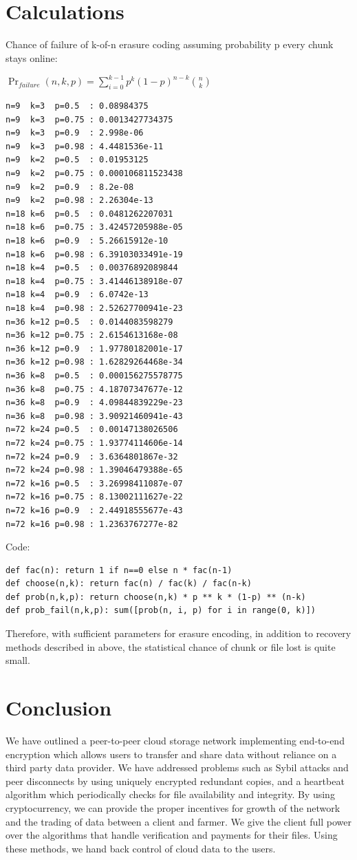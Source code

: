 \documentclass[a4paper,10pt]{article}
\begin{document}
\section{Calculations}
Chance of failure of k-of-n erasure coding assuming probability p every chunk stays online:

{\centering
$\Pr_{failure}(n,k,p) = \displaystyle \sum_{i=0}^{k-1} p^{k}(1-p)^{n-k }{n \choose k}$
\\}


\begin{lstlisting}
n=9  k=3  p=0.5  : 0.08984375
n=9  k=3  p=0.75 : 0.0013427734375
n=9  k=3  p=0.9  : 2.998e-06
n=9  k=3  p=0.98 : 4.4481536e-11
n=9  k=2  p=0.5  : 0.01953125
n=9  k=2  p=0.75 : 0.000106811523438
n=9  k=2  p=0.9  : 8.2e-08
n=9  k=2  p=0.98 : 2.26304e-13
n=18 k=6  p=0.5  : 0.0481262207031
n=18 k=6  p=0.75 : 3.42457205988e-05
n=18 k=6  p=0.9  : 5.26615912e-10
n=18 k=6  p=0.98 : 6.39103033491e-19
n=18 k=4  p=0.5  : 0.00376892089844
n=18 k=4  p=0.75 : 3.41446138918e-07
n=18 k=4  p=0.9  : 6.0742e-13
n=18 k=4  p=0.98 : 2.52627700941e-23
n=36 k=12 p=0.5  : 0.0144083598279
n=36 k=12 p=0.75 : 2.6154613168e-08
n=36 k=12 p=0.9  : 1.97780182001e-17
n=36 k=12 p=0.98 : 1.62829264468e-34
n=36 k=8  p=0.5  : 0.000156275578775
n=36 k=8  p=0.75 : 4.18707347677e-12
n=36 k=8  p=0.9  : 4.09844839229e-23
n=36 k=8  p=0.98 : 3.90921460941e-43
n=72 k=24 p=0.5  : 0.00147138026506
n=72 k=24 p=0.75 : 1.93774114606e-14
n=72 k=24 p=0.9  : 3.6364801867e-32
n=72 k=24 p=0.98 : 1.39046479388e-65
n=72 k=16 p=0.5  : 3.26998411087e-07
n=72 k=16 p=0.75 : 8.13002111627e-22
n=72 k=16 p=0.9  : 2.44918555677e-43
n=72 k=16 p=0.98 : 1.2363767277e-82
\end{lstlisting}

Code:
\begin{lstlisting}
def fac(n): return 1 if n==0 else n * fac(n-1)
def choose(n,k): return fac(n) / fac(k) / fac(n-k) 
def prob(n,k,p): return choose(n,k) * p ** k * (1-p) ** (n-k)
def prob_fail(n,k,p): sum([prob(n, i, p) for i in range(0, k)])
\end{lstlisting}
Therefore, with sufficient parameters for erasure encoding, in addition to recovery methods described in above, the statistical chance of chunk or file lost is quite small. 

\section{Conclusion}
We have outlined a peer-to-peer cloud storage network implementing end-to-end encryption which allows users to transfer and share data without reliance on a third party data provider. We have addressed problems such as Sybil attacks and peer disconnects by using uniquely encrypted redundant copies, and a heartbeat algorithm which periodically checks for file availability and integrity. By using cryptocurrency, we can provide the proper incentives for growth of the network and the trading of data between a client and farmer. We give the client full power over the algorithms that handle verification and payments for their files. Using these methods, we hand back control of cloud data to the users. 




\begingroup
  \raggedright
  
\endgroup
\end{document}
